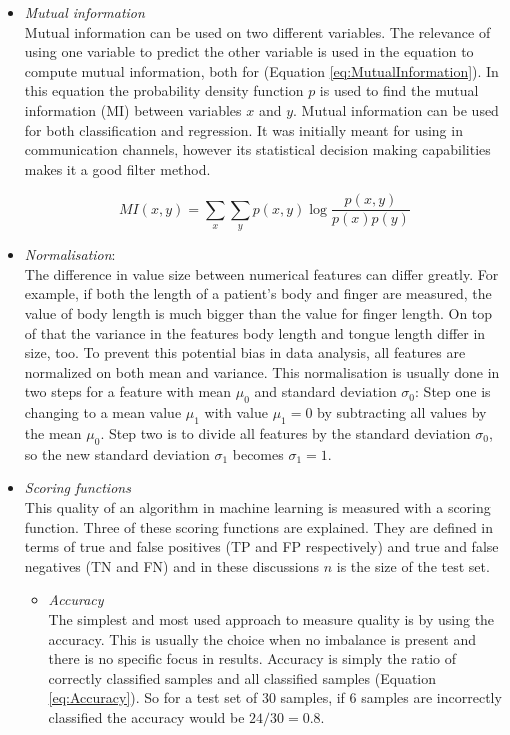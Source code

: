 \documentclass[10pt,a4paper]{report}
\begin{document}
\begin{itemize}
		\item \textit{Mutual information} \\
		Mutual information can be used on two different variables. The relevance of using one variable to predict the other variable is used in the equation to compute mutual information, both for  (Equation \ref{eq:MutualInformation}). In this equation the probability density function $p$ is used to find the mutual information (MI) between variables $x$ and $y$\cite{peng2005feature}. Mutual information can be used for both classification and regression. It was initially meant for using in communication channels, however its statistical decision making capabilities makes it a good filter method\cite{battiti1994using}.
		
		\begin{equation}\label{eq:MutualInformation}
		MI(x, y) = \sum_x \sum_y p(x, y) \log{\frac{p(x, y)}{p(x)p(y)}}
		\end{equation}
		
		
		\item \textit{Normalisation}:\\
		The difference in value size between numerical features can differ greatly. For example, if both the length of a patient's body and finger are measured, the value of body length is much bigger than the value for finger length. On top of that the variance in the features body length and tongue length differ in size, too. To prevent this potential bias in data analysis, all features are normalized on both mean and variance. This normalisation is usually done in two steps for a feature with mean $\mu_0$ and standard deviation $\sigma_0$: Step one is changing to a mean value $\mu_1$ with value $\mu_1 = 0$ by subtracting all values by the mean $\mu_0$. Step two is to divide all features by the standard deviation $\sigma_0$, so the new standard deviation $\sigma_1$ becomes $\sigma_1 = 1$.
		\item \textit{Scoring functions} \\
		This quality of an algorithm in machine learning is measured with a scoring function. Three of these scoring functions are explained. They are defined in terms of true and false positives (TP and FP respectively) and true and false negatives (TN and FN) and in these discussions $n$ is the size of the test set.
		\begin{itemize}
			\item \textit{Accuracy} \\
			The simplest and most used approach to measure quality is by using the accuracy. This is usually the choice when no imbalance is present and there is no specific focus in results. Accuracy is simply the ratio of correctly classified samples and all classified samples (Equation \ref{eq:Accuracy}). So for a test set of 30 samples, if 6 samples are incorrectly classified the accuracy would be $24/30 = 0.8$. 
			

\end{itemize}
\end{itemize}
\end{document}
